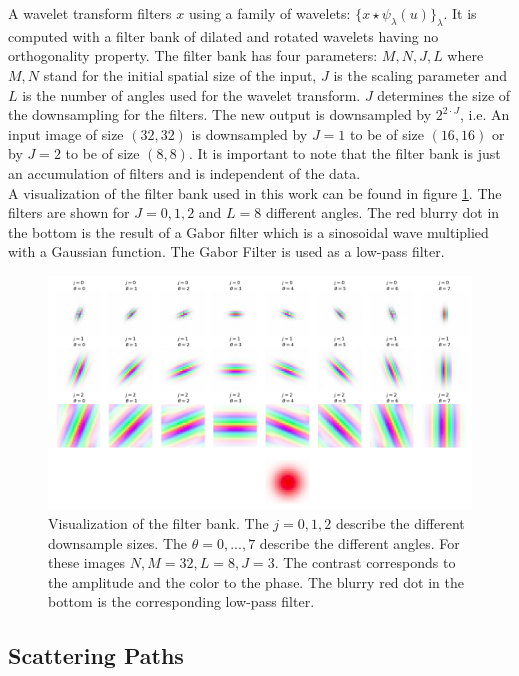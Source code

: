 A wavelet transform filters $x$ using a family of wavelets: $\{x \star \psi_\lambda (u)\}_\lambda$. It is computed with a filter bank of dilated and rotated wavelets having no orthogonality property. The filter bank has four parameters: $M, N, J, L$ where $M,N$ stand for the initial spatial size of the input, $J$ is the scaling parameter and $L$ is the number of angles used for the wavelet transform. $J$ determines the size of the downsampling for the filters. The new output is downsampled by $2^{2\cdot J}$, i.e. An input image of size $(32, 32)$ is downsampled by $J=1$ to be of size $(16,16)$ or by $J=2$ to be of size $(8,8)$. It is important to note that the filter bank is just an accumulation of filters and is independent of the data. \\
A visualization of the filter bank used in this work can be found in figure \ref{fig:viz_filter_bank}. The filters are shown for $J=0,1,2$ and $L=8$ different angles. The red blurry dot in the bottom is the result of a Gabor filter which is a sinosoidal wave multiplied with a Gaussian function. The Gabor Filter is used as a low-pass filter. 


\begin{figure}[!htb]
	\centering
	\includegraphics[width=\textwidth]{images/filter_bank_vis2.png}
	\caption{Visualization of the filter bank. The $j=0,1,2$ describe the different downsample sizes. The $\theta=0,...,7$ describe the different angles. For these images $N,M=32, L=8, J=3$. The contrast corresponds to the amplitude and the color to the phase. The blurry red dot in the bottom is the corresponding low-pass filter.}
    \label{fig:viz_filter_bank}
\end{figure}


\subsection{Scattering Paths}
\label{subsec:scattering_path}

